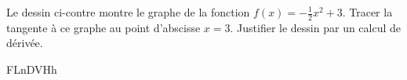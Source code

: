 
\begin{exercice}\label{exosmath-0405}

    Le dessin ci-contre montre le graphe de la fonction \( f(x)=-\frac{ 1 }{ 2 }x^2+3\). Tracer la tangente à ce graphe au point d'abscisse \( x=3\).  Justifier le dessin par un calcul de dérivée.


FLnDVHh

\end{exercice}
